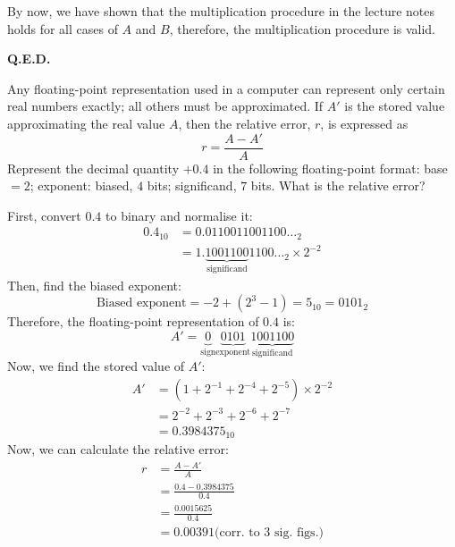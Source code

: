 \documentclass[answers]{exam}
\begin{document}
\begin{questions}
\begin{solution}
        By now, we have shown that the multiplication procedure in the lecture notes holds for all cases of $A$ and $B$,
        therefore, the multiplication procedure is valid.

        \hfill \textbf{Q.E.D.}
    \end{solution}

    \question Any floating-point representation used in a computer can represent only certain real numbers exactly; all
    others must be approximated. If $A'$ is the stored value approximating the real value $A$, then the relative
    error, $r$, is expressed as
    \begin{equation*}
        r = \frac{A - A'}{A}
    \end{equation*}
    Represent the decimal quantity $+0.4$ in the following floating-point format: base $= 2$; exponent: biased, $4$
    bits; significand, $7$ bits. What is the relative error?

    \begin{solution}
        First, convert $0.4$ to binary and normalise it:
        \begin{align*}
            0.4_{10} &= 0.0110011001100\dots_2 \\
            &= 1.\underbrace{1001100}_{\text{significand}}1100\dots_2 \times 2^{-2}
        \end{align*}
        Then, find the biased exponent:
        \begin{equation*}
            \text{Biased exponent} = -2 + (2^3 - 1) = 5_10 = 0101_2
        \end{equation*}
        Therefore, the floating-point representation of $0.4$ is:
        \[
            A' = \underbrace{0}_{\text{sign}} \underbrace{0101}_\text{exponent} \underbrace{1001100}_\text{significand}
        \]
        Now, we find the stored value of $A'$:
        \begin{align*}
            A' &= (1 + 2^{-1} + 2^{-4} + 2^{-5}) \times 2^{-2} \\
            &= 2^{-2} + 2^{-3} + 2^{-6} + 2^{-7} \\
            &= 0.3984375_{10}
        \end{align*}
        Now, we can calculate the relative error:
        \begin{align*}
            r &= \frac{A - A'}{A} \\
            &= \frac{0.4-0.3984375}{0.4} \\
            &= \frac{0.0015625}{0.4} \\
            &= \boxed{0.00391} \text{(corr. to 3 sig. figs.)}
        \end{align*}
    \end{solution}


\end{questions}
\end{document}
